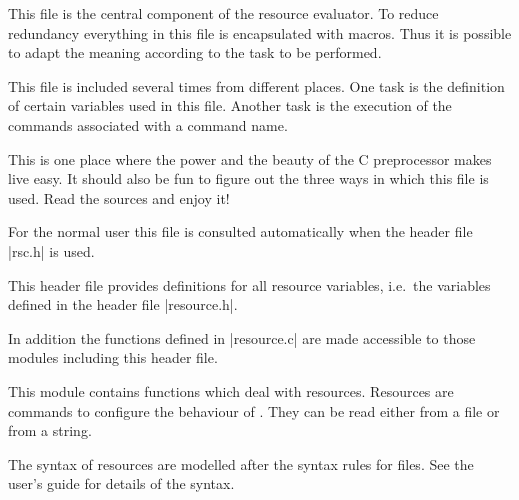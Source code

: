 
This file is the central component of the resource evaluator.
To reduce redundancy everything in this file is encapsulated
with macros. Thus it is possible to adapt the meaning
according to the task to be performed.

This file is included several times from different places. One
task is the definition of certain variables used in this
file. Another task is the execution of the commands associated
with a command name.

This is one place where the power and the beauty of the C
preprocessor makes live easy. It should also be fun to figure out
the three ways in which this file is used.  Read the sources and
enjoy it! 

For the normal user this file is consulted automatically when
the header file |rsc.h| is used.



This header file provides definitions for all resource
variables, i.e.\ the variables defined in the header file
|resource.h|. 

In addition the functions defined in |resource.c| are made
accessible to those modules including this header file.


This module contains functions which deal with resources.
Resources are commands to configure the behaviour of
\BibTool. They can be read either from a file or from a
string. 

The syntax of resources are modelled after the syntax rules
for \BibTeX{} files. See the user's guide for details of the syntax.

